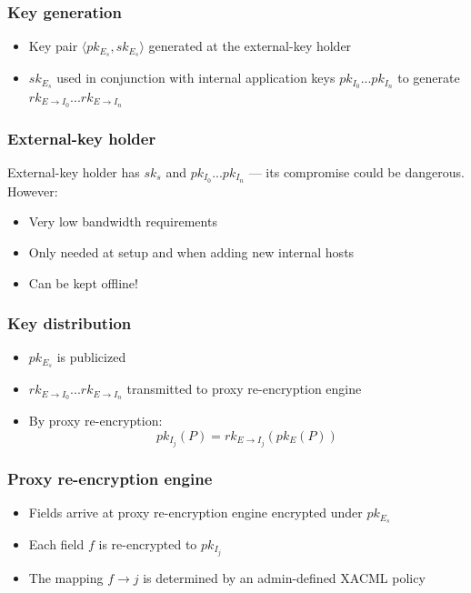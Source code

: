 \documentclass{beamer}
\begin{document}
\begin{frame}
\frametitle{Key generation}
\begin{itemize}
\item Key pair $\langle pk_{E_s}, sk_{E_s} \rangle$ generated at the
\alert{external-key holder}
\item $sk_{E_s}$ used in conjunction with internal application keys
$pk_{I_0}...pk_{I_n}$ to generate $rk_{E \to I_0}...rk_{E \to I_n}$
\end{itemize}
\end{frame}

\begin{frame}
\frametitle{External-key holder}
External-key holder has $sk_s$ and $pk_{I_0}...pk_{I_n}$ --- its compromise
could be dangerous.  However:
\smallskip
\begin{itemize}
\item Very low bandwidth requirements
\item Only needed at setup and when adding new internal hosts
\item Can be kept offline!
\end{itemize}
\end{frame}

\begin{frame}
\frametitle{Key distribution}
\begin{itemize}
\item $pk_{E_s}$ is publicized
\item $rk_{E \to I_0}...rk_{E \to I_n}$ transmitted to \alert{proxy
re-encryption engine}
\item By proxy re-encryption:
\begin{equation*}
pk_{I_j}(P) = rk_{E \to I_j}( pk_E (P))
\end{equation*}
\end{itemize}
\end{frame}

\begin{frame}
\frametitle{Proxy re-encryption engine}
\begin{itemize}
\item Fields arrive at proxy re-encryption engine encrypted under $pk_{E_s}$
\item Each field $f$ is re-encrypted to $pk_{I_j}$
\item The mapping $f \to j$ is determined by an admin-defined XACML policy
\end{itemize}
\end{frame}
\end{document}

